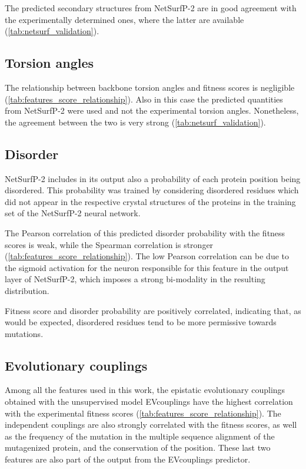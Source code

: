 The predicted secondary structures from NetSurfP-2 are in good agreement with the experimentally determined ones, where the latter are available (\autoref{tab:netsurf_validation}).

\subsection{Torsion angles}
The relationship between backbone torsion angles and fitness scores is negligible (\autoref{tab:features_score_relationship}).
Also in this case the predicted quantities from NetSurfP-2 were used and not the experimental torsion angles.
Nonetheless, the agreement between the two is very strong (\autoref{tab:netsurf_validation}).

\subsection{Disorder}
NetSurfP-2 includes in its output also a probability of each protein position being disordered.
This probability was trained by considering disordered residues which did not appear in the respective crystal structures of the proteins in the training set of the NetSurfP-2 neural network.

The Pearson correlation of this predicted disorder probability with the fitness scores is weak, while the Spearman correlation is stronger (\autoref{tab:features_score_relationship}).
The low Pearson correlation can be due to the sigmoid activation for the neuron responsible for this feature in the output layer of NetSurfP-2, which imposes a strong bi-modality in the resulting distribution.

Fitness score and disorder probability are positively correlated, indicating that, as would be expected, disordered residues tend to be more permissive towards mutations.

\subsection{Evolutionary couplings}
Among all the features used in this work, the epistatic evolutionary couplings obtained with the unsupervised model EVcouplings have the highest correlation with the experimental fitness scores (\autoref{tab:features_score_relationship}).
The independent couplings are also strongly correlated with the fitness scores, as well as the frequency of the mutation in the multiple sequence alignment of the mutagenized protein, and the conservation of the position.
These last two features are also part of the output from the EVcouplings predictor.

